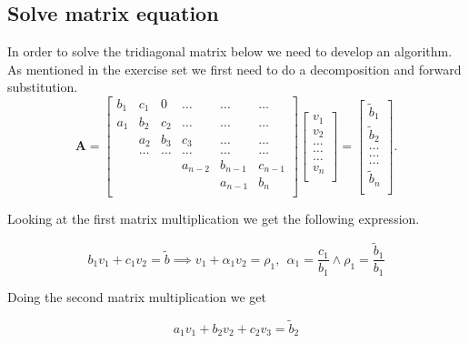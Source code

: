 \documentclass[reprint, english,notitlepage]{revtex4-1}  %
\begin{document}
\subsection{Solve matrix equation}

In order to solve the tridiagonal matrix below we need to develop an algorithm. As mentioned in the exercise set we first need to do a decomposition and forward substitution.
\begin{equation*}
\mathbf{A} = \begin{bmatrix}
b_1& c_1 & 0 &\dots   & \dots &\dots \\
a_1 & b_2 & c_2 &\dots &\dots &\dots \\
& a_2 & b_3 & c_3 & \dots & \dots \\
& \dots   & \dots &\dots   &\dots & \dots \\
&   &  &a_{n-2}  &b_{n-1}& c_{n-1} \\
&    &  &   &a_{n-1} & b_n \\
\end{bmatrix}\begin{bmatrix}
v_1\\
v_2\\
\dots \\
\dots  \\
\dots \\
v_n\\
\end{bmatrix}
=\begin{bmatrix}
\tilde{b}_1\\
\tilde{b}_2\\
\dots \\
\dots \\
\dots \\
\tilde{b}_n\\
\end{bmatrix}.
\end{equation*}

Looking at the first matrix multiplication we get the following expression.

\begin{equation}
	b_1 v_1 + c_1 v_2 = \tilde{b} \implies v_1 + \alpha_1 v_2 = \rho _1, \ \ \alpha_1 = \frac{c_1}{b_1} \wedge \rho_1 = \frac{\tilde{b}_1}{b_1} 
	\label{eq:mat1}
\end{equation}

Doing the second matrix multiplication we get

\begin{equation}
	a_1 v_1 + b_2 v_2 + c_2 v_3 = \tilde{b}_2
	\label{eq:mat2}
\end{equation}
\end{document}

